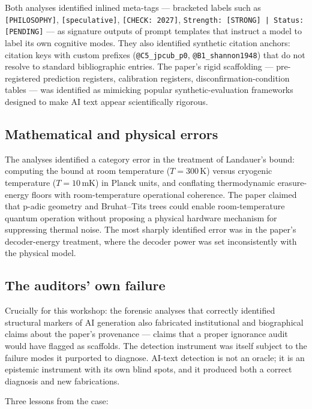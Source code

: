 \documentclass{article}
\begin{document}
Both analyses identified inlined meta-tags --- bracketed labels such as \texttt{[PHILOSOPHY]}, \texttt{[speculative]}, \texttt{[CHECK: 2027]}, \texttt{Strength: [STRONG] | Status: [PENDING]} --- as signature outputs of prompt templates that instruct a model to label its own cognitive modes. They also identified synthetic citation anchors: citation keys with custom prefixes (\texttt{@C5\_jpcub\_p0}, \texttt{@B1\_shannon1948}) that do not resolve to standard bibliographic entries. The paper's rigid scaffolding --- pre-registered prediction registers, calibration registers, disconfirmation-condition tables --- was identified as mimicking popular synthetic-evaluation frameworks designed to make AI text appear scientifically rigorous.

\subsection{Mathematical and physical errors}

The analyses identified a category error in the treatment of Landauer's bound: computing the bound at room temperature ($T = 300$\,K) versus cryogenic temperature ($T = 10$\,mK) in Planck units, and conflating thermodynamic erasure-energy floors with room-temperature operational coherence. The paper claimed that p-adic geometry and Bruhat--Tits trees could enable room-temperature quantum operation without proposing a physical hardware mechanism for suppressing thermal noise. The most sharply identified error was in the paper's decoder-energy treatment, where the decoder power was set inconsistently with the physical model.

\subsection{The auditors' own failure}

Crucially for this workshop: the forensic analyses that correctly identified structural markers of AI generation also fabricated institutional and biographical claims about the paper's provenance --- claims that a proper ignorance audit would have flagged as scaffolds. The detection instrument was itself subject to the failure modes it purported to diagnose. AI-text detection is not an oracle; it is an epistemic instrument with its own blind spots, and it produced both a correct diagnosis and new fabrications.

Three lessons from the case:
\end{document}
